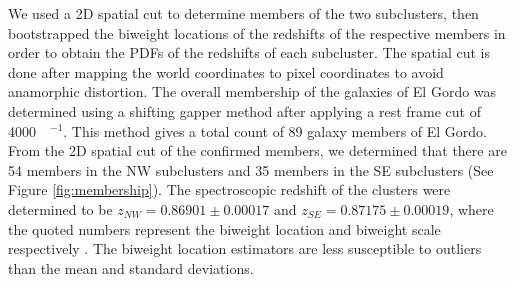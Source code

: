 

We used a 2D spatial cut to determine members of the two
subclusters, then bootstrapped the biweight locations of the redshifts of the
respective members in order to obtain the PDFs of the redshifts of each
subcluster. The spatial cut is done after mapping the world coordinates to
pixel coordinates to avoid anamorphic distortion. 
 The overall membership of the galaxies
of El Gordo was determined using a shifting gapper method after applying a
rest frame cut of 4000~\kilo\meter~\second$^{-1}$. This method gives a
total count of 89 galaxy members of El Gordo. From the 2D spatial cut of
the confirmed members, we determined that there are 54 members in the NW
subclusters and 35 members in the SE subclusters (See Figure
\ref{fig:membership}). The spectroscopic redshift of the clusters were
determined to be $z_{NW} = 0.86901 \pm 0.00017$ and $z_{SE} = 0.87175 \pm
0.00019$, where the quoted numbers represent the biweight location and
biweight scale respectively \citep{Beers90}. 
The biweight location
estimators are less susceptible to outliers than the mean and standard
deviations. 

%
